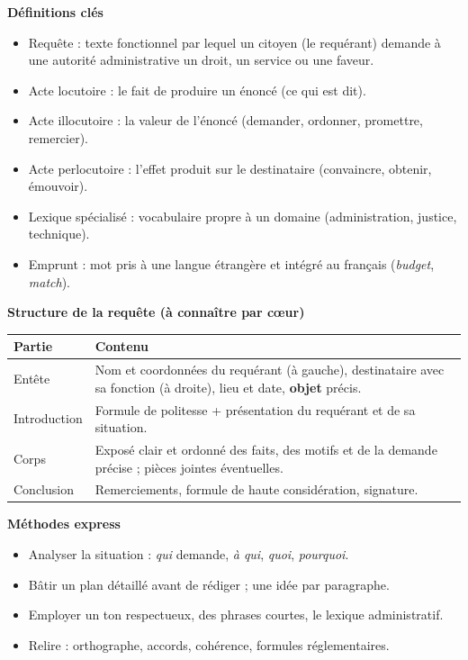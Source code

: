 \documentclass[11pt]{article}
\newcommand{\cle}[1]{{\popxbold\color{popdark}#1}}
\begin{document}
\begin{bilan}
\textbf{Définitions clés}
\begin{itemize}
  \item \cle{Requête} : texte fonctionnel par lequel un citoyen (le \cle{requérant}) demande à une autorité administrative un droit, un service ou une faveur.
  \item \cle{Acte locutoire} : le fait de produire un énoncé (ce qui est dit).
  \item \cle{Acte illocutoire} : la valeur de l'énoncé (demander, ordonner, promettre, remercier).
  \item \cle{Acte perlocutoire} : l'effet produit sur le destinataire (convaincre, obtenir, émouvoir).
  \item \cle{Lexique spécialisé} : vocabulaire propre à un domaine (administration, justice, technique).
  \item \cle{Emprunt} : mot pris à une langue étrangère et intégré au français (\emph{budget}, \emph{match}).
\end{itemize}

\textbf{Structure de la requête (à connaître par cœur)}
\begin{center}
\begin{tabularx}{\linewidth}{|l|X|}
\hline
\rowcolor{popblueL} \textbf{Partie} & \textbf{Contenu} \\
\hline
Entête & Nom et coordonnées du requérant (à gauche), destinataire avec sa fonction (à droite), lieu et date, \textbf{objet} précis. \\
\hline
Introduction & Formule de politesse + présentation du requérant et de sa situation. \\
\hline
Corps & Exposé clair et ordonné des faits, des motifs et de la demande précise ; pièces jointes éventuelles. \\
\hline
Conclusion & Remerciements, formule de haute considération, signature. \\
\hline
\end{tabularx}
\end{center}

\textbf{Méthodes express}
\begin{itemize}
  \item Analyser la situation : \emph{qui} demande, \emph{à qui}, \emph{quoi}, \emph{pourquoi}.
  \item Bâtir un plan détaillé avant de rédiger ; une idée par paragraphe.
  \item Employer un ton respectueux, des phrases courtes, le lexique administratif.
  \item Relire : orthographe, accords, cohérence, formules réglementaires.
\end{itemize}
\end{bilan}
\end{document}
